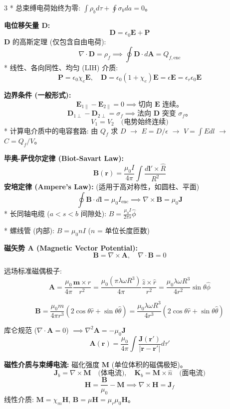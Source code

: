 \documentclass[10pt,a4paper,landscape,utf8]{ctexart}
\newcommand{\bs}[1]{\boldsymbol{#1}}
\begin{document}
\begin{multicols*}{3}
* 总束缚电荷始终为零: $\int \rho_b d\tau + \oint \sigma_b da = 0$。

\textbf{电位移矢量 $\bs{D}$:}
$$ \bs{D} = \epsilon_0\bs{E} + \bs{P} $$
$\bs{D}$ 的高斯定理 (仅包含自由电荷):
$$ \nabla \cdot \bs{D} = \rho_f \implies \oint \bs{D} \cdot d\bs{A} = Q_{f, \text{enc}} $$
* 线性、各向同性、均匀 (LIH) 介质:
$$ \bs{P} = \epsilon_0 \chi_e \bs{E}, \quad \bs{D} = \epsilon_0(1+\chi_e)\bs{E} = \epsilon \bs{E} = \epsilon_r\epsilon_0\bs{E} $$

\textbf{边界条件 (一般形式):}
$$ \bs{E}_{1\parallel} - \bs{E}_{2\parallel} = 0 \implies \text{切向 } \bs{E} \text{ 连续。} $$
$$ \bs{D}_{1\perp} - \bs{D}_{2\perp} = \sigma_f \implies \text{法向 } \bs{D} \text{ 突变 } \sigma_f \text{。} $$
$$ V_1 = V_2 \quad \text{(电势始终连续)} $$
* 计算电介质中的电容套路: 由 $Q_f$ 求 $D$ $\to$ $E = D/\epsilon$ $\to$ $V = \int E dl$ $\to$ $C = Q_f / V$。


\textbf{毕奥-萨伐尔定律 (Biot-Savart Law):}
$$ \bs{B}(\bs{r}) = \frac{\mu_0 I}{4\pi} \int \frac{d\bs{l}' \times \hat{R}}{R^2} $$
\textbf{安培定律 (Ampere's Law):} (适用于高对称性，如圆柱、平面)
$$ \oint \bs{B} \cdot d\bs{l} = \mu_0 I_{\text{enc}} \implies \nabla \times \bs{B} = \mu_0\bs{J} $$
* 长同轴电缆 ($a < s < b$ 间隙处): $B = \frac{\mu_0 I}{2\pi s}\hat{\phi}$

* 螺线管 (内部): $B = \mu_0 n I$ ($n$ = 单位长度匝数)

\textbf{磁矢势 $\bs{A}$ (Magnetic Vector Potential):}
$$ \bs{B} = \nabla \times \bs{A}, \quad \nabla \cdot \bs{B} = 0 $$

远场标准磁偶极子: $$\bs{A} = \frac{\mu_0}{4\pi} \frac{\bs{m} \times \hat{r}}{r^2} = \frac{\mu_0 (\pi \lambda \omega R^3)}{4\pi} \frac{\hat{z} \times \hat{r}}{r^2} = \frac{\mu_0 \lambda \omega R^3}{4 r^2} \sin\theta \hat{\phi}$$

$$\bs{B} = \frac{\mu_0 m}{4\pi r^3} (2\cos\theta \hat{r} + \sin\theta \hat{\theta}) = \frac{\mu_0 \lambda \omega R^3}{4 r^3} (2\cos\theta \hat{r} + \sin\theta \hat{\theta})$$

库仑规范 ($\nabla \cdot \bs{A} = 0$) $\implies \nabla^2\bs{A} = -\mu_0\bs{J}$
$$ \bs{A}(\bs{r}) = \frac{\mu_0}{4\pi} \int \frac{\bs{J}(\bs{r}')}{|\bs{r}-\bs{r}'|} d\tau' $$

\textbf{磁性介质与束缚电流:}
磁化强度 $\bs{M}$ (单位体积的磁偶极矩)。
$$ \bs{J}_b = \nabla \times \bs{M} \quad \text{(体电流)}, \quad \bs{K}_b = \bs{M} \times \hat{n} \quad \text{(面电流)} $$
$$ \bs{H} = \frac{\bs{B}}{\mu_0} - \bs{M} \implies \nabla \times \bs{H} = \bs{J}_f $$
线性介质: $\bs{M} = \chi_m \bs{H}$, $\bs{B} = \mu\bs{H} = \mu_r\mu_0\bs{H}$。


\end{multicols*}
\end{document}
